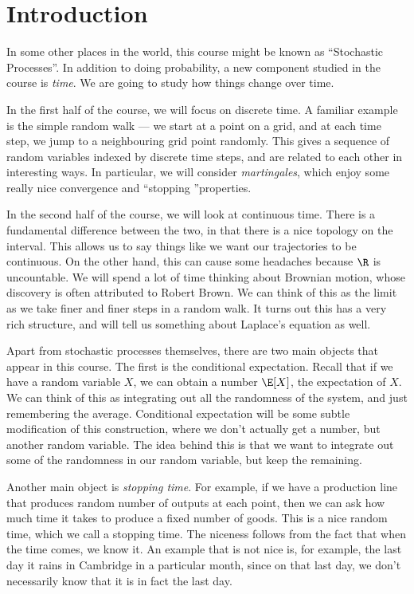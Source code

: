 \documentclass[a4paper]{article}
\begin{document}
\setcounter{section}{-1}
\section{Introduction}
In some other places in the world, this course might be known as ``Stochastic Processes''. In addition to doing probability, a new component studied in the course is \emph{time}. We are going to study how things change over time.

In the first half of the course, we will focus on discrete time. A familiar example is the simple random walk --- we start at a point on a grid, and at each time step, we jump to a neighbouring grid point randomly. This gives a sequence of random variables indexed by discrete time steps, and are related to each other in interesting ways. In particular, we will consider \emph{martingales}, which enjoy some really nice convergence and ``stopping ''properties.

In the second half of the course, we will look at continuous time. There is a fundamental difference between the two, in that there is a nice topology on the interval. This allows us to say things like we want our trajectories to be continuous. On the other hand, this can cause some headaches because $\R$ is uncountable. We will spend a lot of time thinking about Brownian motion, whose discovery is often attributed to Robert Brown. We can think of this as the limit as we take finer and finer steps in a random walk. It turns out this has a very rich structure, and will tell us something about Laplace's equation as well.

Apart from stochastic processes themselves, there are two main objects that appear in this course. The first is the conditional expectation. Recall that if we have a random variable $X$, we can obtain a number $\E[X]$, the expectation of $X$. We can think of this as integrating out all the randomness of the system, and just remembering the average. Conditional expectation will be some subtle modification of this construction, where we don't actually get a number, but another random variable. The idea behind this is that we want to integrate out some of the randomness in our random variable, but keep the remaining.

Another main object is \emph{stopping time}. For example, if we have a production line that produces random number of outputs at each point, then we can ask how much time it takes to produce a fixed number of goods. This is a nice random time, which we call a stopping time. The niceness follows from the fact that when the time comes, we know it. An example that is not nice is, for example, the last day it rains in Cambridge in a particular month, since on that last day, we don't necessarily know that it is in fact the last day.
\end{document}
